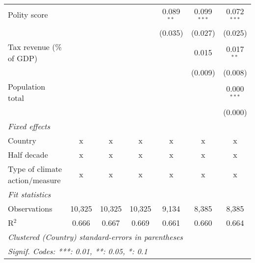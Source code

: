 \begin{tabular}{lcccccc}
   Polity score                                                 &         &               &                & 0.089$^{**}$   & 0.099$^{***}$  & 0.072$^{***}$\\   
                                                                &         &               &                & (0.035)        & (0.027)        & (0.025)\\   
   Tax revenue (\% of GDP)                                      &         &               &                &                & 0.015          & 0.017$^{**}$\\   
                                                                &         &               &                &                & (0.009)        & (0.008)\\   
   Population total                                             &         &               &                &                &                & 0.000$^{***}$\\   
                                                                &         &               &                &                &                & (0.000)\\   
   \emph{Fixed effects}\\
   Country                                                      & x       & x             & x              & x              & x              & x\\  
   Half decade                                                  & x       & x             & x              & x              & x              & x\\  
   Type of climate action/measure                               & x       & x             & x              & x              & x              & x\\  
   \midrule \emph{Fit statistics}\\
   Observations                                                 & 10,325  & 10,325        & 10,325         & 9,134          & 8,385          & 8,385\\  
   R$^2$                                                        & 0.666   & 0.667         & 0.669          & 0.661          & 0.660          & 0.664\\  
   \midrule
   \multicolumn{7}{l}{\emph{Clustered (Country) standard-errors in parentheses}}\\
   \multicolumn{7}{l}{\emph{Signif. Codes: ***: 0.01, **: 0.05, *: 0.1}}\\
\end{tabular}
\par\endgroup


